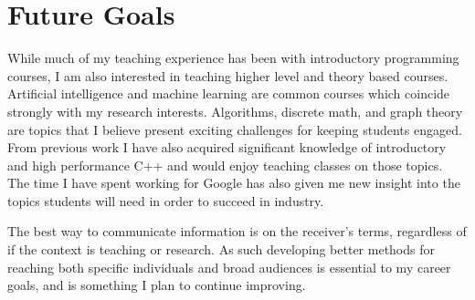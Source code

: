 \documentclass[a4paper, 11pt]{article}
\begin{document}
\section{Future Goals}
While much of my teaching experience has been with introductory
programming courses, I am also interested in teaching higher level
and theory based courses. Artificial intelligence and machine learning
are common courses which coincide strongly with my research interests.
Algorithms, discrete math, and graph theory are topics that I believe
present exciting challenges for keeping students engaged.
From previous work I have also acquired significant knowledge of
introductory and high performance C++ and would enjoy teaching classes
on those topics. The time I have spent working for Google has also given
me new insight into the topics students will need in order to succeed
in industry.

The best way to communicate information is on the receiver's
terms, regardless of if the context is teaching or research.
As such developing better methods for reaching both specific
individuals and broad audiences is essential to my career goals,
and is something I plan to continue improving.
\end{document}
